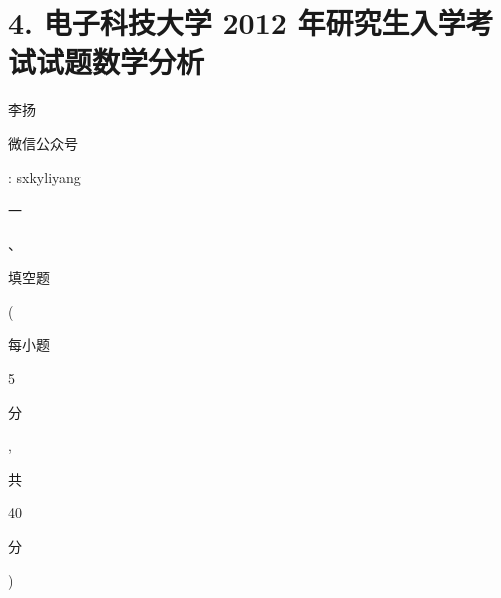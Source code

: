 \documentclass[10pt]{article}
\begin{document}
\section{4. 电子科技大学 2012 年研究生入学考试试题数学分析}
\begin{CJK}{UTF8}{mj}李扬\end{CJK}

\begin{CJK}{UTF8}{mj}微信公众号\end{CJK}: sxkyliyang

\begin{CJK}{UTF8}{mj}一\end{CJK}、\begin{CJK}{UTF8}{mj}填空题\end{CJK}(\begin{CJK}{UTF8}{mj}每小题\end{CJK} 5 \begin{CJK}{UTF8}{mj}分\end{CJK}, \begin{CJK}{UTF8}{mj}共\end{CJK} 40 \begin{CJK}{UTF8}{mj}分\end{CJK})
\end{document}

